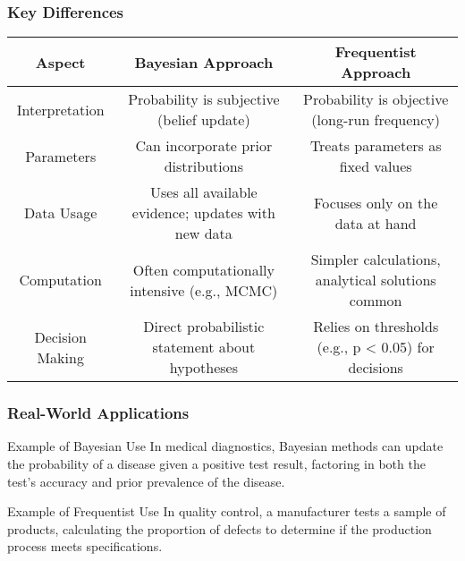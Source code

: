 \documentclass[aspectratio=169]{beamer}
\begin{document}
\begin{frame}[fragile]
    \frametitle{Key Differences}

    \begin{center}
        \begin{tabular}{|c|c|c|}
            \hline
            \textbf{Aspect} & \textbf{Bayesian Approach} & \textbf{Frequentist Approach} \\
            \hline
            Interpretation & Probability is subjective (belief update) & Probability is objective (long-run frequency) \\
            \hline
            Parameters & Can incorporate prior distributions & Treats parameters as fixed values \\
            \hline
            Data Usage & Uses all available evidence; updates with new data & Focuses only on the data at hand \\
            \hline
            Computation & Often computationally intensive (e.g., MCMC) & Simpler calculations, analytical solutions common \\
            \hline
            Decision Making & Direct probabilistic statement about hypotheses & Relies on thresholds (e.g., p < 0.05) for decisions \\
            \hline
        \end{tabular}
    \end{center}
\end{frame}

\begin{frame}[fragile]
    \frametitle{Real-World Applications}

    \begin{block}{Example of Bayesian Use}
        In medical diagnostics, Bayesian methods can update the probability of a disease given a positive test result, factoring in both the test's accuracy and prior prevalence of the disease.
    \end{block}

    \begin{block}{Example of Frequentist Use}
        In quality control, a manufacturer tests a sample of products, calculating the proportion of defects to determine if the production process meets specifications.
    \end{block}
\end{frame}
\end{document}
